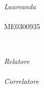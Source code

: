 \begin{titlepage}
{\begin{center}
	
	\vfill\vfill
	
	{\huge\bfseries \theTitle}\\ [0.2cm] %
	
	{\huge \theSubject}\\ [0.2cm] %
	
	\vfill\vfill
	
	
	\begin{minipage}{0.4\textwidth}
		\begin{flushleft}
			\large
			\textit{Laureanda}\\
			\theAuthor\\ %
			\small{ME0300935}
		\end{flushleft}
	\end{minipage}
	~
	\begin{minipage}{0.4\textwidth}
		\begin{flushright}
			\large
			\textit{Relatore}  \\
			\theFirstSupervisor \\ %
			\bigskip
			\textit{Correlatore}\\ 
			\theSecondSupervisor \\ %
		\end{flushright}
	\end{minipage}
	
	
	\vfill\vfill\vfill
	
	{\large \textsc{\theDate}}
	
	\vfill
	\end{center}
}

\end{titlepage}


